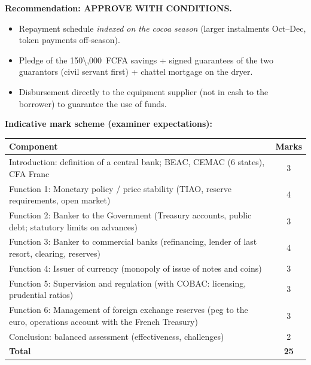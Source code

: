 \documentclass[11pt]{article}
\begin{document}
\begin{corrige}
\textbf{Recommendation: APPROVE WITH CONDITIONS.}
\begin{itemize}
\item Repayment schedule \emph{indexed on the cocoa season} (larger instalments Oct--Dec, token payments off-season).
\item Pledge of the \SI{150\,000}{FCFA} savings + signed guarantees of the two guarantors (civil servant first) + chattel mortgage on the dryer.
\item Disbursement directly to the equipment supplier (not in cash to the borrower) to guarantee the use of funds.
\end{itemize}
\end{corrige}

\begin{corrige}

\textbf{Indicative mark scheme (examiner expectations):}

\begin{center}
\begin{tabularx}{\linewidth}{|X|c|}
\hline
\rowcolor{popblueL} \textbf{Component} & \textbf{Marks} \\
\hline
Introduction: definition of a central bank; BEAC, CEMAC (6 states), CFA Franc & 3 \\
\hline
Function 1: Monetary policy / price stability (TIAO, reserve requirements, open market) & 4 \\
\hline
Function 2: Banker to the Government (Treasury accounts, public debt; statutory limits on advances) & 3 \\
\hline
Function 3: Banker to commercial banks (refinancing, lender of last resort, clearing, reserves) & 4 \\
\hline
Function 4: Issuer of currency (monopoly of issue of notes and coins) & 3 \\
\hline
Function 5: Supervision and regulation (with COBAC: licensing, prudential ratios) & 3 \\
\hline
Function 6: Management of foreign exchange reserves (peg to the euro, operations account with the French Treasury) & 3 \\
\hline
Conclusion: balanced assessment (effectiveness, challenges) & 2 \\
\hline
\rowcolor{popgreenL} \textbf{Total} & \textbf{25} \\
\hline
\end{tabularx}
\end{center}


\end{corrige}
\end{document}
